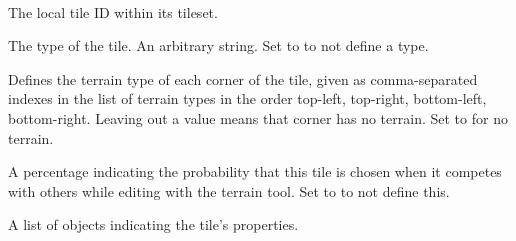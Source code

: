 \documentclass[letterpaper,10pt,english]{sphinxmanual}
\begin{document}
\begin{fulllineitems}
\label{index:tmx.Tile}~

\begin{fulllineitems}
\label{index:tmx.Tile.id}
The local tile ID within its tileset.

\end{fulllineitems}


\begin{fulllineitems}
\label{index:tmx.Tile.type}
The type of the tile.  An arbitrary string.  Set to 
to not define a type.

\end{fulllineitems}


\begin{fulllineitems}
\label{index:tmx.Tile.terrain}
Defines the terrain type of each corner of the tile, given as
comma-separated indexes in the list of terrain types in the order
top-left, top-right, bottom-left, bottom-right.  Leaving out a
value means that corner has no terrain. Set to  for
no terrain.

\end{fulllineitems}


\begin{fulllineitems}
\label{index:tmx.Tile.probability}
A percentage indicating the probability that this tile is chosen
when it competes with others while editing with the terrain tool.
Set to  to not define this.

\end{fulllineitems}


\begin{fulllineitems}
\label{index:tmx.Tile.properties}
A list of {\hyperref[index:tmx.Property]{\emph{}}} objects indicating the tile's
properties.


\end{fulllineitems}
\end{fulllineitems}
\end{document}

